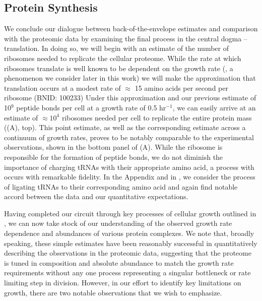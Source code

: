 \subsection{Protein Synthesis}
We conclude our dialogue between back-of-the-envelope estimates and
comparison with the proteomic data by examining the final process in the
central dogma -- translation. In doing so, we will begin with an estimate of
the number of ribosomes needed to replicate the cellular proteome. While the
rate at which ribosomes translate is well known to be dependent on the growth
rate (\cite{dai2018}, a phenomenon we consider later in this work) we will make
the approximation that translation occurs at a modest rate of $\approx$ 15
amino acids per second per ribosome (BNID: 100233) Under this approximation
and our previous estimate of 10$^{9}$ peptide bonds per cell at a growth rate
of 0.5 hr$^{-1}$, we can easily arrive at an estimate of $\approx 10^4$
ribosomes needed per cell to replicate the entire protein mass
((A), top). This point estimate, as well as the
corresponding estimate across a continuum of growth rates, proves to be
notably comparable to the experimental observations, shown in the bottom
panel of (A). While the ribosome is responsible for
the formation of peptide bonds, we do not diminish the importance of charging
tRNAs with their appropriate amino acid, a process with occurs with
remarkable fidelity. In the Appendix and in
, we consider the process of ligating tRNAs
to their corresponding amino acid and again find notable accord between the
data and our quantitative expectations.

Having completed our circuit through key processes of cellular growth
outlined in , we can now take stock of our understanding of the
observed growth rate dependence and abundances of various protein complexes. We
note that, broadly speaking, these simple estimates have been reasonably successful in
quantitatively describing the observations in the proteomic data, suggesting
that the proteome is tuned in composition and absolute abundance to match the
growth rate requirements without any one process representing a singular
bottleneck or rate limiting step in division. However, in our effort to identify
key limitations on growth, there are two notable observations that we
wish to emphasize.

